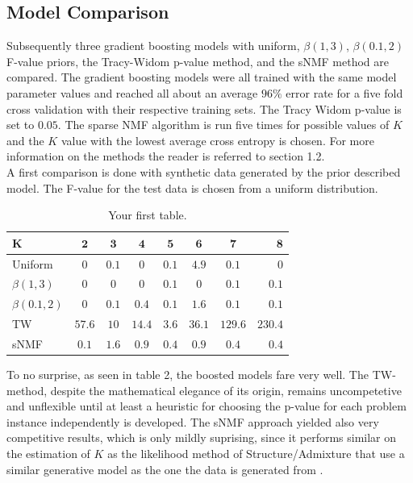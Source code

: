 \documentclass[a4paper, 11pt]{article}
\begin{document}
\subsection{Model Comparison}
Subsequently three gradient boosting models with uniform, $\beta(1,3)$, $\beta(0.1,2)$ F-value priors, the Tracy-Widom p-value method, and the sNMF method are compared. The gradient boosting models were all trained with the same model parameter values and reached all about an average $96\%$ error rate for a five fold cross validation with their respective training sets. The Tracy Widom p-value is set to $0.05$. The sparse NMF algorithm is run five times for possible values of $K$ and the $K$ value with the lowest average cross entropy is chosen. For more information on the methods the reader is referred to section 1.2.\\
A first comparison is done with synthetic data generated by the prior described model. The F-value for the test data is chosen from a uniform distribution.
\begin{table}[h!]
  \begin{center}
    \label{tab:table4}
    \begin{tabular}{l|c|c|c|c|c|c|r} %
      \textbf{K} & $\mathbf{2}$ & $\mathbf{3}$ & $\mathbf{4}$ & $\mathbf{5}$ & $\mathbf{6}$ & $\mathbf{7}$ & $\mathbf{8}$\\
      \hline
      Uniform & $0$ & $0.1$ & $0$ & $0.1$ & $4.9$ & $0.1$ & $0$\\
      \hline
      $\beta(1,3)$ & $0$ & $0$ & $0$ & $0.1$ & $0$ &$0.1$ & $0.1$\\
      \hline
      $\beta(0.1,2)$& $0$ & $0.1$ & $0.4$ & $0.1$ & $1.6$ & $0.1$ & $0.1$\\
      \hline
      TW & $57.6$ & $10$ & $14.4$ & $3.6$ & $36.1$ & $129.6$ & $230.4$\\
      \hline
      sNMF & $0.1$ & $1.6$ & $0.9$ & $0.4$ & $0.9$ &$0.4$ & $0.4$\\
    \end{tabular}
    \caption{Your first table.}
  \end{center}
\end{table}

To no surprise, as seen in table 2, the boosted models fare very well. The TW-method, despite the mathematical elegance of its origin, remains uncompetetive and unflexible until at least a heuristic for choosing the p-value for each problem instance independently is developed. The sNMF approach yielded also very competitive results, which is only mildly suprising, since it performs similar on the estimation of $K$ as the likelihood method of Structure/Admixture that use a similar generative model as the one the data is generated from \cite{frichot2014fast}.\\
\end{document}
